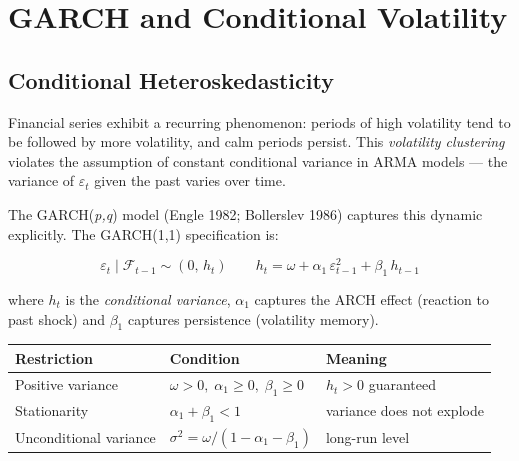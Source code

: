 \chapter{GARCH and Conditional Volatility}
\label{cap:garch}

\section{Conditional Heteroskedasticity}

Financial series exhibit a recurring phenomenon: periods of high
volatility tend to be followed by more volatility, and calm periods
persist. This \emph{volatility clustering} violates the assumption of
constant conditional variance in ARMA models — the variance of $\varepsilon_t$
given the past varies over time.

The GARCH(\textit{p,q}) model (Engle 1982; Bollerslev 1986) captures this
dynamic explicitly. The GARCH(1,1) specification is:

\[
  \varepsilon_t \mid \mathcal{F}_{t-1} \sim (0,\, h_t)
  \qquad
  h_t = \omega + \alpha_1\,\varepsilon_{t-1}^2 + \beta_1\,h_{t-1}
\]

\noindent where $h_t$ is the \emph{conditional variance}, $\alpha_1$ captures the
ARCH effect (reaction to past shock) and $\beta_1$ captures persistence
(volatility memory).

\begin{center}
\begin{tabular}{lll}
\toprule
\textbf{Restriction} & \textbf{Condition} & \textbf{Meaning} \\
\midrule
Positive variance   & $\omega > 0,\; \alpha_1 \geq 0,\; \beta_1 \geq 0$ & $h_t > 0$ guaranteed \\
Stationarity        & $\alpha_1 + \beta_1 < 1$                           & variance does not explode \\
Unconditional variance & $\sigma^2 = \omega/(1-\alpha_1-\beta_1)$       & long-run level \\
\bottomrule
\end{tabular}
\end{center}

